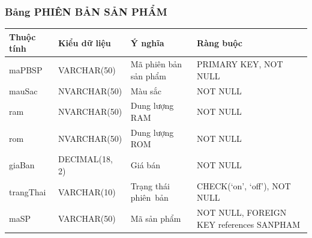 \documentclass[a4paper,12pt]{report}
\begin{document}
\subsubsection{Bảng PHIÊN BẢN SẢN PHẨM}
\noindent
\begin{center}
    \begin{longtable}{|>{\centering\arraybackslash}p{3cm}|
        >{\centering\arraybackslash}p{4cm}|
        >{\centering\arraybackslash}p{4cm}|
        >{\centering\arraybackslash}p{4cm}|}
        \hline
        \textbf{Thuộc tính}                                                                                                               &
        \textbf{Kiểu dữ liệu}                                                                                                                             &
        \textbf{Ý nghĩa}                                                                                                 &
        \textbf{Ràng buộc}                                                                                                         \\
        \hline
        maPBSP &  VARCHAR(50)  & Mã phiên bản sản phẩm & PRIMARY KEY, NOT NULL \\
        \hline
        mauSac &  NVARCHAR(50)  & Màu sắc & NOT NULL \\                                                                                                                          
        \hline
        ram & NVARCHAR(50) & Dung lượng RAM & NOT NULL \\                                                                                                                          
        \hline
        rom & NVARCHAR(50) & Dung lượng ROM & NOT NULL \\                                                                                                                          
        \hline
        giaBan & DECIMAL(18, 2) & Giá bán & NOT NULL \\                                                                                                                          
        \hline
        trangThai &  VARCHAR(10)  & Trạng thái phiên~bản & CHECK(‘on’, ‘off’), NOT NULL \\
        \hline
        maSP & VARCHAR(50) & Mã sản phẩm & NOT NULL, FOREIGN KEY references SANPHAM \\                                                                                                                          
        \hline
    \end{longtable}
\end{center}
\end{document}
